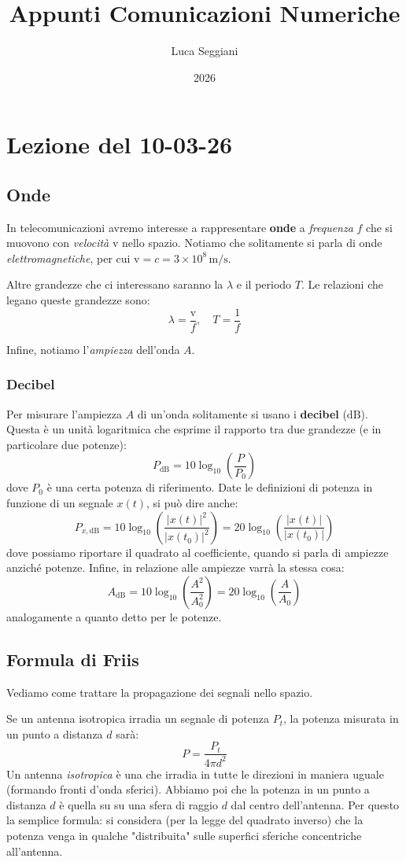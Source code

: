 \documentclass[a4paper,11pt]{article}
\title{Appunti Comunicazioni Numeriche}
\author{Luca Seggiani}
\date{2026}
\begin{document}
\section{Lezione del 10-03-26}

\thispagestyle{empty}
\pagestyle{fancy}

\subsection{Onde}
In telecomunicazioni avremo interesse a rappresentare \textbf{onde} a \textit{frequenza} $f$ che si muovono con \textit{velocità} $\mathrm{v}$ nello spazio. Notiamo che solitamente si parla di onde \textit{elettromagnetiche}, per cui $\mathrm{v} = c = 3 \times 10^{8} \, \mathrm{m}/\mathrm{s}$. 

Altre grandezze che ci interessano saranno la  $\lambda$ e il periodo $T$. Le relazioni che legano queste grandezze sono:
$$
\lambda = \frac{\mathrm{v}}{f}, \quad T = \frac{1}{f}
$$

Infine, notiamo l'\textit{ampiezza} dell'onda $A$.

\subsubsection{Decibel}
Per misurare l'ampiezza $A$ di un'onda solitamente si usano i \textbf{decibel} ($\mathrm{dB}$). Questa è un unità logaritmica che esprime il rapporto tra due grandezze (e in particolare due potenze):
$$
P_\mathrm{dB} = 10 \log_{10} \left( \frac{P}{P_0} \right)
$$
dove $P_0$ è una certa potenza di riferimento. Date le definizioni di potenza in funzione di un segnale $x(t)$, si può dire anche:
$$
P_{x, \mathrm{dB}} = 10 \log_{10} \left( \frac{|x(t)|^2}{|x(t_0)|^2} \right) = 20 \log_{10} \left( \frac{|x(t)|}{|x(t_0)|} \right)
$$
dove possiamo riportare il quadrato al coefficiente, quando si parla di ampiezze anziché potenze. Infine, in relazione alle ampiezze varrà la stessa cosa:
$$
A_\mathrm{dB} = 10 \log_{10} \left( \frac{A^2}{A_0^2} \right) = 20 \log_{10} \left( \frac{A}{A_0} \right)
$$
analogamente a quanto detto per le potenze.

\subsection{Formula di Friis}
Vediamo come trattare la propagazione dei segnali nello spazio.

Se un antenna isotropica irradia un segnale di potenza $P_t$, la potenza misurata in un punto a distanza $d$ sarà:
$$
P = \frac{P_t}{4 \pi d^2}
$$
Un antenna \textit{isotropica} è una che irradia in tutte le direzioni in maniera uguale (formando fronti d'onda sferici). Abbiamo poi che la potenza in un punto a distanza $d$ è quella su su una sfera di raggio $d$ dal centro dell'antenna. Per questo la semplice formula: si considera (per la legge del quadrato inverso) che la potenza venga in qualche "distribuita" sulle superfici sferiche concentriche all'antenna.
\end{document}
